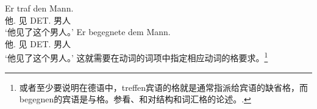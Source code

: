 \begin{exe}
\begin{xlist}[iv.]
\begin{exe}
\begin{xlist}[iv.]
\eal
\ex 
\gll Er traf den Mann.\\
     他.\nom{} 见 DET.\acc{} 男人\\
\glt `他见了这个男人。'
\ex 
\gll Er begegnete dem Mann.\\
     他.\nom{} 见 DET.\dat{} 男人\\
\glt `他见了这个男人。'
\zl
这就需要在动词的词项中指定相应动词的格要求。\footnote{
  或者至少要说明在德语中，treffen宾语的格就是通常指派给宾语的缺省格，而begegnen的宾语是与格。参看、和对结构和词汇格的论述。.
}
%


\end{xlist}
\end{exe}
\end{xlist}
\end{exe}
